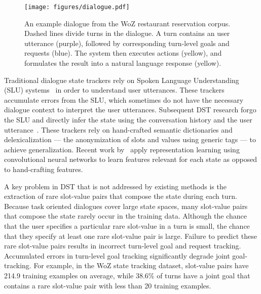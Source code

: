 \documentclass[11pt,a4paper]{article}
\begin{document}
\begin{figure}[!t]
\centering
\texttt{[image: figures/dialogue.pdf]}
\caption{
An example dialogue from the WoZ restaurant reservation corpus.
Dashed lines divide turns in the dialogue.
A turn contains an user utterance (purple), followed by corresponding turn-level goals and requests (blue).
The system then executes actions (yellow), and formulates the result into a natural language response (yellow).
}
\label{fig:dialogue}
\end{figure}











Traditional dialogue state trackers rely on Spoken Language Understanding (SLU) systems~\cite{henderson2012discriminative} in order to understand user utterances.
These trackers accumulate errors from the SLU, which sometimes do not have the necessary dialogue context to interpret the user utterances.
Subsequent DST research forgo the SLU and directly infer the state using the conversation history and the user utterance~\cite{henderson2014word,zilka2015incremental,mrkvsic2015multi}.
These trackers rely on hand-crafted semantic dictionaries and delexicalization --- the anonymization of slots and values using generic tags --- to achieve generalization.
Recent work by~\citet{mrkvsic2016neural} apply representation learning using convolutional neural networks to learn features relevant for each state as opposed to hand-crafting features.







A key problem in DST that is not addressed by existing methods is the extraction of rare slot-value pairs that compose the state during each turn.
Because task oriented dialogues cover large state spaces, many slot-value pairs that compose the state rarely occur in the training data.
Although the chance that the user specifies a particular rare slot-value in a turn is small, the chance that they specify at least one rare slot-value pair is large.
Failure to predict these rare slot-value pairs results in incorrect turn-level goal and request tracking.
Accumulated errors in turn-level goal tracking significantly degrade joint goal-tracking.
For example, in the WoZ state tracking dataset, slot-value pairs have 214.9 training examples on average, while 38.6\% of turns have a joint goal that contains a rare slot-value pair with less than 20 training examples.
\end{document}
